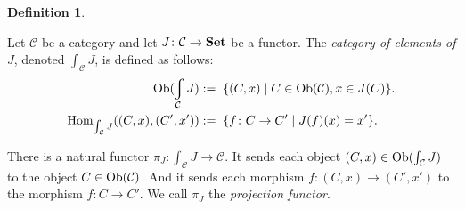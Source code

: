 \documentclass{book}
\def\tn{\textnormal}
\def\mc{\mathcal}
\def\Hom{\tn{Hom}}
\def\Ob{\tn{Ob}}
\def\to{\rightarrow}
\def\taking{\colon}
\def\too{\longrightarrow}
\def\|{{\;|\;}}
\def\Set{{\bf Set}}
\def\mcC{\mc{C}}
\theoremstyle{remark}
\theoremstyle{definition}
\newtheorem{definition}[subsubsection]{Definition}
\begin{document}
\begin{definition}\label{def:grothendieck}

Let $\mcC$ be a category and let $J\taking\mcC\to\Set$ be a functor. The {\em category of elements of $J$}, denoted $\int_\mcC J$, is defined as follows:
\begin{align*}
\Ob(\varint_\mcC J):=&\;\;\{(C,x)\|C\in\Ob(\mcC), x\in J(C)\}.\\
\Hom_{\int_\mcC J}((C,x),(C',x')):=&\;\;\{f\taking C\to C'\|J(f)(x)=x'\}.
\end{align*}

There is a natural functor $\pi_J\taking\int_\mcC J\too\mcC$. It sends each object $(C,x)\in\Ob(\int_\mcC J)$ to the object $C\in\Ob(\mcC)$. And it sends each morphism $f\taking (C,x)\to (C',x')$ to the morphism $f\taking C\to C'$. We call $\pi_J$ the {\em projection functor}.

\end{definition}
\end{document}
